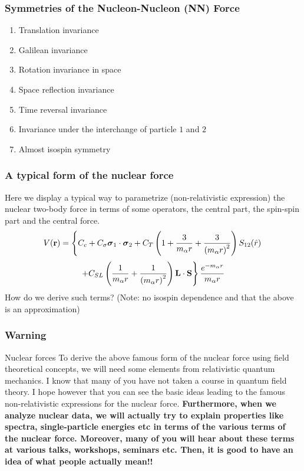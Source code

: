\documentclass[compress]{beamer}
\begin{document}
\frame
{
\frametitle{Symmetries of the Nucleon-Nucleon (NN) Force}
\begin{enumerate}
\item Translation invariance
\item Galilean invariance
\item  Rotation invariance in space
\item Space reflection invariance
\item Time reversal invariance
\item Invariance under the interchange of particle $1$ and $2$
\item Almost isospin symmetry
\end{enumerate}
} 




\frame
{
\frametitle{A typical form of the nuclear force}
Here we display a typical way to parametrize (non-relativistic expression) the nuclear two-body force
in terms of some operators, the central part, the spin-spin part and the central force.
\[
V({\bf r})= \left\{ C_c + C_\sigma 
\mbox{\boldmath $\sigma$}_1\cdot\mbox{\boldmath $\sigma$}_2
 + C_T \left( 1 + {3\over m_\alpha r} + {3\over
\left(m_\alpha r\right)^2}\right) S_{12} (\hat r)\right. 
\]
\[
\left. + C_{SL} \left( {1\over m_\alpha r} + {1\over \left( m_\alpha r\right)^2}
\right) {\bf L}\cdot {\bf S}
\right\} \frac{e^{-m_\alpha r}}{m_\alpha r}
\]
How do we derive such terms?  (Note: no isospin dependence and that the above is an approximation)
} 

\frame
{
  \frametitle{Warning}
  \begin{block}{Nuclear forces}
To derive the above famous form of the nuclear force using field theoretical concepts, we will need some 
elements from relativistic quantum mechanics. I know that many of you have not taken a course in quantum field theory. I hope however that you can see the basic ideas leading to the famous non-relativistic expressions for the nuclear force. \newline\newline
{\bf Furthermore, when we analyze nuclear data, we will actually try to explain properties like spectra, single-particle energies etc in terms of the various terms of the nuclear force. Moreover, many of you will hear about these terms at various talks, workshops, seminars etc. Then, it is good to have an idea of what people actually mean!!}
  \end{block}
} 
\end{document}
